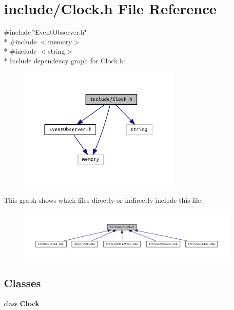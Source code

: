 \section{include/\+Clock.h File Reference}
\label{_clock_8h}
{\ttfamily \#include \char`\"{}Event\+Observer.\+h\char`\"{}}\\*
{\ttfamily \#include $<$memory$>$}\\*
{\ttfamily \#include $<$string$>$}\\*
Include dependency graph for Clock.\+h\+:
\nopagebreak
\begin{figure}[H]
\begin{center}
\leavevmode
\includegraphics[width=232pt]{_clock_8h__incl}
\end{center}
\end{figure}
This graph shows which files directly or indirectly include this file\+:
\nopagebreak
\begin{figure}[H]
\begin{center}
\leavevmode
\includegraphics[width=350pt]{_clock_8h__dep__incl}
\end{center}
\end{figure}
\subsection*{Classes}
\begin{DoxyCompactItemize}
\item 
class {\bf Clock}
\end{DoxyCompactItemize}
